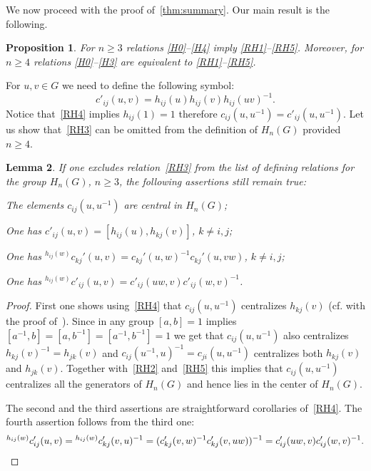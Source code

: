 \documentclass[oneside, 10pt]{amsart}
\theoremstyle{plain}
\numberwithin{equation}{section}
\newtheorem{lemma}{Lemma}
\numberwithin{lemma}{section}
\newtheorem{prop}[lemma]{Proposition}
\theoremstyle{remark}
\theoremstyle{definition}
\begin{document}
We now proceed with the proof of~\cref{thm:summary}.
Our main result is the following.
\begin{prop} \label{prop:simpler} 
For $n\geq 3$ relations \eqref{H0}--\eqref{H4} imply \eqref{RH1}--\eqref{RH5}.
Moreover, for $n\geq 4$ relations \eqref{H0}--\eqref{H3} are equivalent to \eqref{RH1}--\eqref{RH5}.
\end{prop}
For $u, v\in G$ we need to define the following symbol:
\[ c'_{ij}(u,v)=h_{ij}(u)h_{ij}(v)h_{ij}(uv)^{-1}.\]
Notice that~\eqref{RH4} implies $h_{ij}(1)=1$ therefore $c_{ij}(u, u^{-1}) = c'_{ij}(u, u^{-1})$.
Let us show that~\eqref{RH3} can be omitted from the definition of $H_n(G)$ provided $n \geq 4$.
\begin{lemma} \label{item-lem33} If one excludes relation~\eqref{RH3} from the list of defining relations for the group $H_n(G)$, $n\geq 3$,
 the following assertions still remain true:
 \begin{lemlist}
\item \label{item-lem33-cntr} The elements $c_{ij}(u, u^{-1})$ are central in $H_n(G)$;
\item \label{item-lem33-comm} One has $c'_{ij}(u, v) = [h_{ij}(u), h_{kj}(v)]$, $k\neq i, j$;
\item \label{item-lem33-conj}  One has ${}^{h_{ij}(w)}c_{kj}'(u, v) = c_{kj}'(u, w)^{-1} c_{kj}'(u, vw)$, $k\neq i, j$;
\item \label{item-lem33-conj2} One has ${}^{h_{ij}(w)} c'_{ij}(u, v) = c'_{ij}(uw, v) c'_{ij}(w, v)^{-1}$.
 \end{lemlist}
\end{lemma}
\begin{proof}
First one shows using~\eqref{RH4} that $c_{ij}(u, u^{-1})$ centralizes $h_{kj}(v)$ (cf. with the proof of~\cite[Lemma~2.1(2)]{Reh78}).
Since in any group $[a, b]=1$ implies $[a^{-1}, b] = [a, b^{-1}] = [a^{-1}, b^{-1}] = 1$ we get that $c_{ij}(u, u^{-1})$ also centralizes $h_{kj}(v)^{-1} = h_{jk}(v)$ and
 $c_{ij}(u^{-1}, u)^{-1} = c_{ji}(u, u^{-1})$ centralizes both $h_{kj}(v)$ and $h_{jk}(v)$.
Together with~\eqref{RH2} and~\eqref{RH5} this implies that $c_{ij}(u, u^{-1})$ centralizes all the generators of $H_n(G)$ and hence lies in the center of $H_n(G)$.

The second and the third assertions are straightforward corollaries of~\eqref{RH4}.
The fourth assertion follows from the third one:
\[{}^{h_{ij}(w)} c'_{ij}(u, v) = {}^{h_{ij}(w)} c'_{kj}(v, u)^{-1} = (c'_{kj}(v, w)^{-1} c'_{kj}(v, uw))^{-1} = c'_{ij}(uw, v) c'_{ij}(w, v)^{-1}. \qedhere\]
\end{proof}
\end{document}
